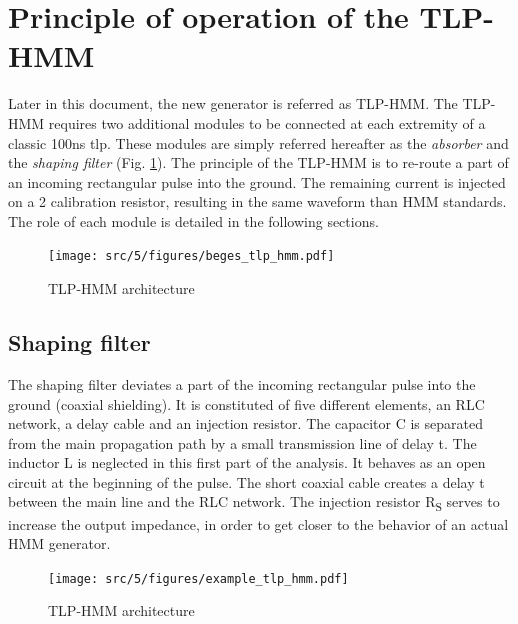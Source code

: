 \section{Principle of operation of the TLP-HMM}

Later in this document, the new generator is referred as TLP-HMM.
The TLP-HMM requires two additional modules to be connected at each extremity of a classic 100ns \gls{tlp}.
These modules are simply referred hereafter as the \textit{absorber} and the \textit{shaping filter} (Fig. \ref{fig:tlp_hmm_architecture}).
The principle of the TLP-HMM is to re-route a part of an incoming rectangular pulse into the ground.
The remaining current is injected on a 2\textOmega{} calibration resistor, resulting in the same waveform than HMM standards.
The role of each module is detailed in the following sections.

\begin{figure}[!h]
  \centering
  \texttt{[image: src/5/figures/beges\_tlp\_hmm.pdf]}
  \caption{TLP-HMM architecture}
  \label{fig:tlp_hmm_architecture}
\end{figure}

\subsection{Shaping filter}

The shaping filter deviates a part of the incoming rectangular pulse into the ground (coaxial shielding).
It is constituted of five different elements, an RLC network, a delay cable and an injection resistor.
The capacitor C is separated from the main propagation path by a small transmission line of delay \textDelta{}t.
The inductor L is neglected in this first part of the analysis.
It behaves as an open circuit at the beginning of the pulse.
The short coaxial cable creates a delay \textDelta{}t between the main line and the RLC network.
The injection resistor R\textsubscript{S} serves to increase the output impedance, in order to get closer to the behavior of an actual HMM generator.

\begin{figure}[!h]
  \centering
  \texttt{[image: src/5/figures/example\_tlp\_hmm.pdf]}
  \caption{TLP-HMM architecture}
  \label{fig:shaping_filter_example}
\end{figure}


